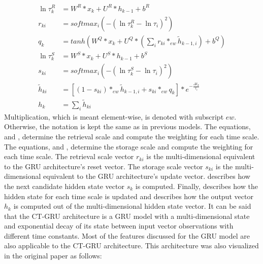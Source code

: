 \documentclass[draft,final]{vutinfth} %
\begin{document}
    \begin{align}
        \label{retrieval_scale}
        \ln{\tau_k^R} &= W^R*x_k + U^R*h_{k-1} + b^R \\
        \label{retrieval_weighting}
        r_{ki} &= softmax_i(-(\ln{\tau_k^R-\ln{\tau_i}})^2) \\
        \label{relevant_event_signals}
        q_k &= tanh(W^Q*x_k + U^Q*(\sum_i {r_{ki} *_{ew} \tilde{h}_{k-1,i}}) + b^Q) \\
        \label{storage_scale}
        \ln{\tau_k^S} &= W^S*x_k + U^S*h_{k-1} + b^S \\
        \label{storage_weighting}
        s_{ki} &= softmax_i(-(\ln{\tau_k^S-\ln{\tau_i}})^2) \\
        \label{state_update}
        \tilde{h}_{ki} &= [(1 - s_{ki}) *_{ew} \tilde{h}_{k-1,i} + s_{ki} *_{ew} q_k] * e^{-\frac{\Delta t_k}{\tau_i}} \\
        \label{state_output}
        h_k &= \sum_i{\tilde{h}_{ki}}
    \end{align}
    Multiplication, which is meant element-wise, is denoted with subscript $ew$. Otherwise, the notation is kept the same as in previous models.
    The equations,  and , determine the retrieval scale and compute the weighting for each time scale.
    The equations,  and , determine the storage scale and compute the weighting for each time scale.
    The retrieval scale vector $r_{ki}$ is the multi-dimensional equivalent to the GRU architecture's reset vector. The storage scale vector $s_{ki}$ is the multi-dimensional equivalent to the GRU architecture's update vector.
     describes how the next candidate hidden state vector $s_k$ is computed.
    Finally,  describes how the hidden state for each time scale is updated and  describes how the output vector $h_k$ is computed out of the multi-dimensional hidden state vector.
    It can be said that the CT-GRU architecture is a GRU model with a multi-dimensional state and exponential decay of its state between input vector observations with different time constants.
    Most of the features discussed for the GRU model are also applicable to the CT-GRU architecture.
    This architecture was also visualized in the original paper as follows:
\end{document}
